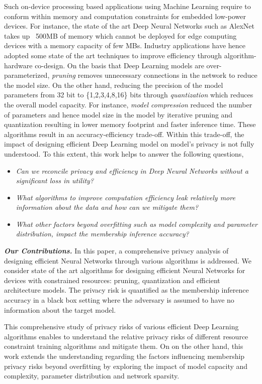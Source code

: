 Such on-device processing based applications using Machine Learning require to conform within memory and computation constraints for embedded low-power devices.
For instance, the state of the art Deep Neural Networks such as AlexNet takes up ~500MB of memory which cannot be deployed for edge computing devices with a memory capacity of few MBs.
Industry applications have hence adopted some state of the art techniques to improve efficiency through algorithm-hardware co-design.
On the basis that Deep Learning models are over-parameterized, \textit{pruning} removes unnecessary connections in the network to reduce the model size.
On the other hand, reducing the precision of the model parameters from 32 bit to \{1,2,3,4,8,16\} bits through \textit{quantization} which reduces the overall model capacity.
For instance, \textit{model compression} reduced the number of parameters and hence model size in the model by iterative pruning and quantization resulting in lower memory footprint and faster inference time.
These algorithms result in an accuracy-efficiency trade-off.
Within this trade-off, the impact of designing efficient Deep Learning model on model's privacy is not fully understood.
To this extent, this work helps to answer the following questions,
\begin{itemize}
\item \textit{Can we reconcile privacy and efficiency in Deep Neural Networks without a significant loss in utility?}
\item \textit{What algorithms to improve computation efficiency leak relatively more information about the data and how can we mitigate them?}
\item \textit{What other factors beyond overfitting such as model complexity and parameter distribution, impact the membership inference accuracy?}
\end{itemize}

\textbf{\textit{Our Contributions.}} In this paper, a comprehensive privacy analysis of designing efficient Neural Networks through various algorithms is addressed.
We consider state of the art algorithms for designing efficient Neural Networks for devices with constrained resources: pruning, quantization and efficient architecture models.
The privacy risk is quantified as the membership inference accuracy in a black box setting where the adversary is assumed to have no information about the target model.



This comprehensive study of privacy risks of various efficient Deep Learning algorithms enables to understand the relative privacy risks of different resource constraint training algorithms and mitigate them.
On on the other hand, this work extends the understanding regarding the factors influencing membership privacy risks beyond overfitting by exploring the impact of model capacity and complexity, parameter distribution and network sparsity.
